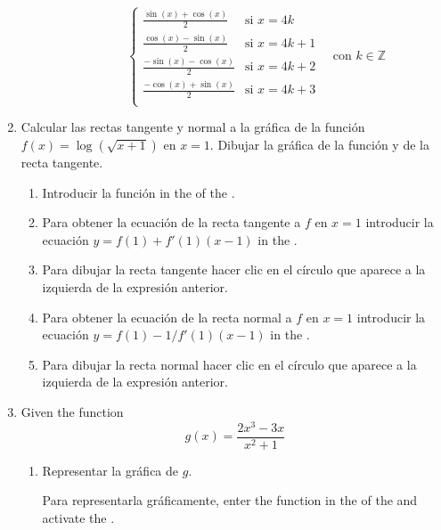 \begin{enumerate}[leftmargin=*]
\begin{enumerate}
\begin{indication}
\begin{enumerate}
\[                  \begin{cases}
                  \frac{\sin(x)+\cos(x)}{2}  & \mbox{si $x=4k$}   \\
                  \frac{\cos(x)-\sin(x)}{2}  & \mbox{si $x=4k+1$} \\
                  \frac{-\sin(x)-\cos(x)}{2} & \mbox{si $x=4k+2$} \\
                  \frac{-\cos(x)+\sin(x)}{2} & \mbox{si $x=4k+3$} \\
                  \end{cases}
                  \quad \mbox{con $k\in \mathbb{Z}$}
                  \]
            \end{enumerate}
            \end{indication}
      \end{enumerate}

\item Calcular las rectas tangente y normal a la gráfica de la función $f(x)=\log(\sqrt{x+1})$ en $x=1$.
      Dibujar la gráfica de la función y de la recta tangente.
      \begin{indication}
      \begin{enumerate}
      \item Introducir la función  in the  of the .
      \item Para obtener la ecuación de la recta tangente a $f$ en $x=1$ introducir la ecuación $y=f(1)+f'(1)(x-1)$ in the .
      \item Para dibujar la recta tangente hacer clic en el círculo que aparece a la izquierda de la expresión anterior.
      \item Para obtener la ecuación de la recta normal a $f$ en $x=1$ introducir la ecuación $y=f(1)-1/f'(1)(x-1)$ in the .
      \item Para dibujar la recta normal hacer clic en el círculo que aparece a la izquierda de la expresión anterior.
      \end{enumerate}
      \end{indication}



\item Given the function
      \[
      g(x)=\dfrac{2x^{3}-3x}{x^{2}+1}
      \]

      \begin{enumerate}
      \item Representar la gráfica de $g$.
            \begin{indication}
            Para representarla gráficamente, enter the function  in the  of the  and activate the .
            \end{indication}


\end{enumerate}
\end{enumerate}

